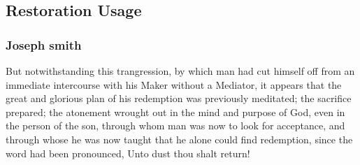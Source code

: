 
\subsection{Restoration Usage} %
	\label{MERIT-REsTORATION}

	\subsubsection{Joseph smith} %
		\label{MERIT-Js}
	
		\begin{compactdesc} %
			\item[{\hyperlink{EMs-1834-Js-CIR-MAR-1834-q}{Circa March 1834}}] But notwithstanding this trangression, by which man had cut himself off from an immediate intercourse with his Maker without a Mediator, it appears that the great and glorious plan of his redemption was previously meditated; the sacrifice prepared; the atonement wrought out in the mind and purpose of God, even in the person of the son, through whom man was now to look for acceptance, and through whose  he was now taught that he alone could find redemption, since the word had been pronounced, Unto dust thou shalt return!
		\end{compactdesc}
		
	
	
	

